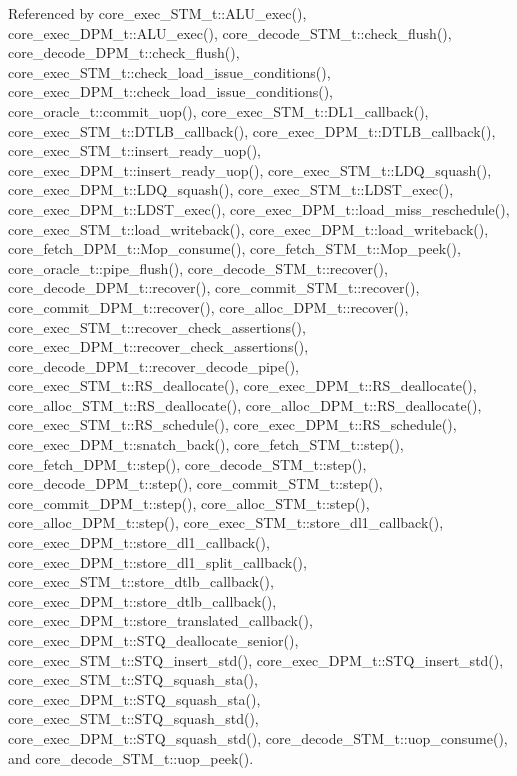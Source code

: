 Referenced by core\_\-exec\_\-STM\_\-t::ALU\_\-exec(), core\_\-exec\_\-DPM\_\-t::ALU\_\-exec(), core\_\-decode\_\-STM\_\-t::check\_\-flush(), core\_\-decode\_\-DPM\_\-t::check\_\-flush(), core\_\-exec\_\-STM\_\-t::check\_\-load\_\-issue\_\-conditions(), core\_\-exec\_\-DPM\_\-t::check\_\-load\_\-issue\_\-conditions(), core\_\-oracle\_\-t::commit\_\-uop(), core\_\-exec\_\-STM\_\-t::DL1\_\-callback(), core\_\-exec\_\-STM\_\-t::DTLB\_\-callback(), core\_\-exec\_\-DPM\_\-t::DTLB\_\-callback(), core\_\-exec\_\-STM\_\-t::insert\_\-ready\_\-uop(), core\_\-exec\_\-DPM\_\-t::insert\_\-ready\_\-uop(), core\_\-exec\_\-STM\_\-t::LDQ\_\-squash(), core\_\-exec\_\-DPM\_\-t::LDQ\_\-squash(), core\_\-exec\_\-STM\_\-t::LDST\_\-exec(), core\_\-exec\_\-DPM\_\-t::LDST\_\-exec(), core\_\-exec\_\-DPM\_\-t::load\_\-miss\_\-reschedule(), core\_\-exec\_\-STM\_\-t::load\_\-writeback(), core\_\-exec\_\-DPM\_\-t::load\_\-writeback(), core\_\-fetch\_\-DPM\_\-t::Mop\_\-consume(), core\_\-fetch\_\-STM\_\-t::Mop\_\-peek(), core\_\-oracle\_\-t::pipe\_\-flush(), core\_\-decode\_\-STM\_\-t::recover(), core\_\-decode\_\-DPM\_\-t::recover(), core\_\-commit\_\-STM\_\-t::recover(), core\_\-commit\_\-DPM\_\-t::recover(), core\_\-alloc\_\-DPM\_\-t::recover(), core\_\-exec\_\-STM\_\-t::recover\_\-check\_\-assertions(), core\_\-exec\_\-DPM\_\-t::recover\_\-check\_\-assertions(), core\_\-decode\_\-DPM\_\-t::recover\_\-decode\_\-pipe(), core\_\-exec\_\-STM\_\-t::RS\_\-deallocate(), core\_\-exec\_\-DPM\_\-t::RS\_\-deallocate(), core\_\-alloc\_\-STM\_\-t::RS\_\-deallocate(), core\_\-alloc\_\-DPM\_\-t::RS\_\-deallocate(), core\_\-exec\_\-STM\_\-t::RS\_\-schedule(), core\_\-exec\_\-DPM\_\-t::RS\_\-schedule(), core\_\-exec\_\-DPM\_\-t::snatch\_\-back(), core\_\-fetch\_\-STM\_\-t::step(), core\_\-fetch\_\-DPM\_\-t::step(), core\_\-decode\_\-STM\_\-t::step(), core\_\-decode\_\-DPM\_\-t::step(), core\_\-commit\_\-STM\_\-t::step(), core\_\-commit\_\-DPM\_\-t::step(), core\_\-alloc\_\-STM\_\-t::step(), core\_\-alloc\_\-DPM\_\-t::step(), core\_\-exec\_\-STM\_\-t::store\_\-dl1\_\-callback(), core\_\-exec\_\-DPM\_\-t::store\_\-dl1\_\-callback(), core\_\-exec\_\-DPM\_\-t::store\_\-dl1\_\-split\_\-callback(), core\_\-exec\_\-STM\_\-t::store\_\-dtlb\_\-callback(), core\_\-exec\_\-DPM\_\-t::store\_\-dtlb\_\-callback(), core\_\-exec\_\-DPM\_\-t::store\_\-translated\_\-callback(), core\_\-exec\_\-DPM\_\-t::STQ\_\-deallocate\_\-senior(), core\_\-exec\_\-STM\_\-t::STQ\_\-insert\_\-std(), core\_\-exec\_\-DPM\_\-t::STQ\_\-insert\_\-std(), core\_\-exec\_\-STM\_\-t::STQ\_\-squash\_\-sta(), core\_\-exec\_\-DPM\_\-t::STQ\_\-squash\_\-sta(), core\_\-exec\_\-STM\_\-t::STQ\_\-squash\_\-std(), core\_\-exec\_\-DPM\_\-t::STQ\_\-squash\_\-std(), core\_\-decode\_\-STM\_\-t::uop\_\-consume(), and core\_\-decode\_\-STM\_\-t::uop\_\-peek().
